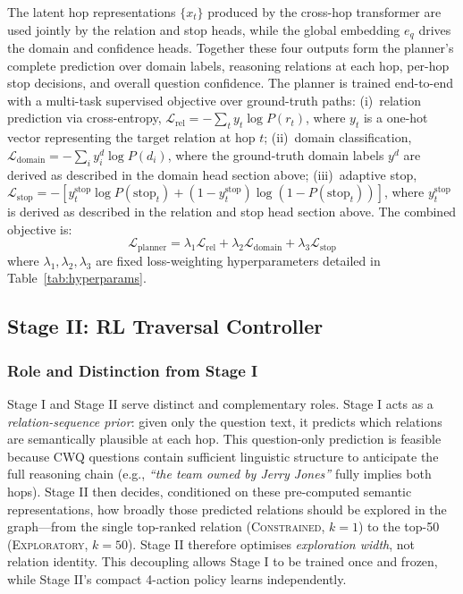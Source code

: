 \documentclass[10pt,conference]{IEEEtran}
\begin{document}
The latent hop representations $\{x_t\}$ produced by the cross-hop transformer are used jointly by the relation and stop heads, while the global embedding $e_q$ drives the domain and confidence heads. Together these four outputs form the planner's complete prediction over domain labels, reasoning relations at each hop, per-hop stop decisions, and overall question confidence. The planner is trained end-to-end with a multi-task supervised objective over ground-truth paths: (i)~relation prediction via cross-entropy, $\mathcal{L}_{\text{rel}} = -\sum_t y_t \log P(r_t)$, where $y_t$ is a one-hot vector representing the target relation at hop $t$; (ii)~domain classification, $\mathcal{L}_{\text{domain}} = -\sum_i y_i^d \log P(d_i)$, where the ground-truth domain labels $y^d$ are derived as described in the domain head section above; (iii)~adaptive stop, $\mathcal{L}_{\text{stop}} = -[y^{\text{stop}}_t \log P(\text{stop}_t) + (1-y^{\text{stop}}_t)\log(1-P(\text{stop}_t))]$, where $y^{\text{stop}}_t$ is derived as described in the relation and stop head section above. The combined objective is:
\begin{equation}
\mathcal{L}_{\text{planner}} = \lambda_1 \mathcal{L}_{\text{rel}} + \lambda_2 \mathcal{L}_{\text{domain}} + \lambda_3 \mathcal{L}_{\text{stop}}
\end{equation}
where $\lambda_1, \lambda_2, \lambda_3$ are fixed loss-weighting hyperparameters detailed in Table~\ref{tab:hyperparams}.

\subsection{Stage II: RL Traversal Controller}

\subsubsection{Role and Distinction from Stage I}

Stage I and Stage II serve distinct and complementary roles. Stage I acts as a \emph{relation-sequence prior}: given only the question text, it predicts which relations are semantically plausible at each hop. This question-only prediction is feasible because CWQ questions contain sufficient linguistic structure to anticipate the full reasoning chain (e.g., \textit{``the team owned by Jerry Jones''} fully implies both hops). Stage II then decides, conditioned on these pre-computed semantic representations, how broadly those predicted relations should be explored in the graph---from the single top-ranked relation (\textsc{Constrained}, $k{=}1$) to the top-50 (\textsc{Exploratory}, $k{=}50$). Stage II therefore optimises \emph{exploration width}, not relation identity. This decoupling allows Stage I to be trained once and frozen, while Stage II's compact 4-action policy learns independently.
\end{document}
